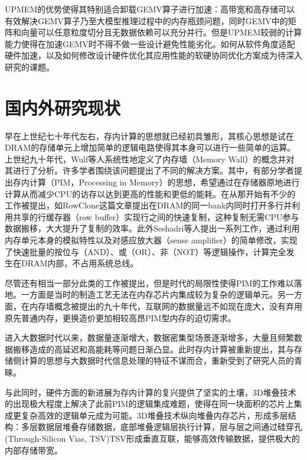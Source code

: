 UPMEM的优势使得其特别适合卸载GEMV算子进行加速：高带宽和高存储可以有效解决GEMV算子乃至大模型推理过程中的内存瓶颈问题，同时GEMV中的矩阵和向量可以任意粒度切分且无数据依赖可以充分并行。但是UPMEM较弱的计算能力使得在加速GEMV时不得不做一些设计避免性能劣化。如何从软件角度适配硬件加速，以及如何修改设计硬件优化其应用性能的软硬协同优化方案成为待深入研究的课题。

\section{国内外研究现状}

早在上世纪七十年代左右，存内计算的思想就已经初具雏形\cite{CellularLogicInMemory,LogicInMemory}，其核心思想是试在DRAM的存储单元上增加简单的逻辑电路使得其本身可以进行一些简单的运算。上世纪九十年代，Wulf等人系统性地定义了内存墙（Memory Wall）的概念并对其进行了分析\cite{MemoryWall}。许多学者围绕该问题提出了不同的解决方案。其中，有部分学者提出存内计算（PIM，Processing in Memory）的思想，希望通过在存储器原地进行计算从而减少CPU的访存以达到更高的性能和更低的能耗。在从那开始有不少的工作被提出，如RowClone\cite{RowClone}这篇文章提出在DRAM的同一bank内同时打开多行并利用共享的行缓存器（row buffer）实现行之间的快速复制，这种复制无需CPU参与数据搬移，大大提升了复制的效率。此外Seshadri等人\cite{BitAndOr,Ambit}提出一系列工作，通过利用内存单元本身的模拟特性以及对感应放大器（sense amplifier）的简单修改，实现了快速批量的按位与（AND）、或（OR）、非（NOT）等逻辑操作，计算完全发生在DRAM内部，不占用系统总线。

尽管还有相当一部分此类的工作被提出，但是时代的局限性使得PIM的工作难以落地。一方面是当时的制造工艺无法在内存芯片内集成较为复杂的逻辑单元。另一方面，在内存墙概念被提出的九十年代，互联网的数据量远不如现在庞大，没有弃用原先普通内存，更换造价更加相较高昂PIM型内存的迫切需求。

进入大数据时代以来，数据量逐渐增大，数据密集型场景逐渐增多，大量且频繁数据搬移造成的高延迟和高能耗等问题日渐凸显。此时存内计算被重新提出，其与存储侧计算的思想与大数据时代信息处理的特征不谋而合，重新受到了研究人员的青睐\cite{NDPWorkshop}。

与此同时，硬件方面的新进展为存内计算的复兴提供了坚实的土壤，3D堆叠技术的出现极大程度上解决了此前PIM的逻辑集成难题，使得在同一块面积的芯片上集成更复杂高效的逻辑单元成为可能。3D堆叠技术纵向堆叠内存芯片，形成多层结构：多层数据层堆叠存储数据，底部堆叠逻辑层执行计算，层与层之间通过硅穿孔(Through-Silicon Vias, TSV)TSV形成垂直互联，能够高效传输数据，提供极大的内部存储带宽。

